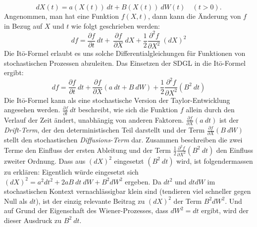 
\begin{equation}
	dX(t) = a(X(t)) \ dt + B(X(t)) \ dW(t) \quad (t>0).
\end{equation}
Angenommen, man hat eine Funktion $ f(X,t) $, dann kann die Änderung von $ f $ in Bezug auf $ X $ und $ t $ wie folgt geschrieben werden:
\begin{equation}
	df = \frac{\partial f}{\partial t} \ dt + \ \frac{\partial f}{\partial X} \ dX + \frac{1}{2} \frac{\partial^2 f} {\partial X^2} \ (dX)^2	
\end{equation}
Die Itō-Formel erlaubt es uns solche Differentialgleichungen für Funktionen von stochastischen Prozessen abzuleiten. Das Einsetzen der SDGL in die Itō-Formel ergibt:
\begin{equation}
	df = \frac{\partial f}{\partial t} \ dt + \frac{\partial f}{\partial X} (a \ dt + B \ dW) + \frac{1}{2} \frac{\partial^2 f}{\partial X^2} (B^2 \ dt)
\end{equation}
Die Itō-Formel kann als eine stochastische Version der Taylor-Entwicklung angesehen werden. $ \frac{\partial f}{\partial t} \ dt $ beschreibt, wie sich die Funktion $ f $ allein durch den Verlauf der Zeit ändert, unabhängig von anderen Faktoren. $ \frac{\partial f}{\partial X} (a \ dt) $ ist der \textit{Drift-Term}, der den deterministischen Teil darstellt und der Term $  \frac{\partial f}{\partial X} (B \ dW) $ stellt den stochastischen \textit{Diffusions-Term} dar. Zusammen beschreiben die zwei Terme den Einfluss der ersten Ableitung und der Term $ \frac{1}{2} \frac{\partial^2 f}{\partial X^2} (B^2 \ dt) $ den Einfluss zweiter Ordnung. Dass aus $ (dX)^2 $ eingesetzt $ (B^2 \ dt) $ wird, ist folgendermassen zu erklären:
Eigentlich würde eingesetzt sich $ (dX)^2 = a^2 dt^2 + 2a B \ dt \ dW + B^2 dW^2 $ ergeben. Da $ dt^2 $ und $ dtdW $ im stochastischen Kontext vernachlässigbar klein sind (tendieren viel schneller gegen Null als $ dt $), ist der einzig relevante Beitrag zu $ (dX)^2 $ der Term $ B^2 dW^2 $. Und auf Grund der Eigenschaft des Wiener-Prozesses, dass $ dW^2 = dt $ ergibt, wird der dieser Ausdruck zu $ B^2 \ dt $.


